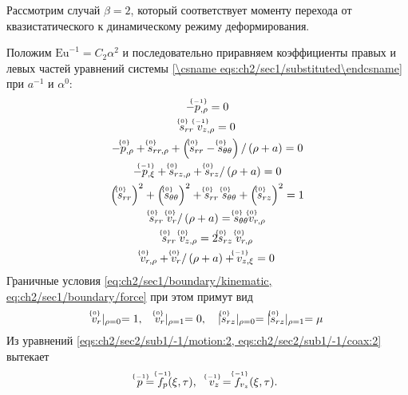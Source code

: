Рассмотрим случай $\beta=2$, который соответствует моменту перехода от квазистатического к динамическому режиму деформирования.

Положим $\text{Eu}^{-1} = C_2 \alpha^2$ и последовательно приравняем коэффициенты правых и левых частей уравнений системы \cref{\csname eqs:ch2/sec1/substituted\endcsname} при $a^{-1}$ и $\alpha^0$:
\begingroup
\allowdisplaybreaks
\begin{gather}
  \label{eqs:ch2/sec2/sub1/-1/motion:2}
  -\uindex{p}{-1}_{,\rho} = 0
  \\
  \label{eqs:ch2/sec2/sub1/-1/coax:2}
  \uindex{s}{0}_{rr} \; \uindex{v}{-1}_{z,\rho} = 0
  \\
  \label{eqs:ch2/sec2/sub1/0/motion:1}
  -\uindex{p}{0}_{,\rho}+\uindex{s}{0}_{rr,\rho} + \left(\uindex{s}{0}_{rr}-\uindex{s}{0}_{\theta\theta}\right) / \left(\rho + a\right) = 0
  \\
  \label{eqs:ch2/sec2/sub1/0/motion:2}
  -\uindex{p}{-1}_{,\xi} + \uindex{s}{0}_{rz,\rho} + \uindex{s}{0}_{rz} / \left(\rho+a\right) = 0
  \\
  \label{eqs:ch2/sec2/sub1/0/plasticity}
  \left(\uindex{s}{0}_{rr}\right)^2 + \left(\uindex{s}{0}_{\theta\theta}\right)^2 + \uindex{s}{0}_{rr}\; \uindex{s}{0}_{\theta\theta} + \left(\uindex{s}{0}_{rz}\right)^2 = 1
  \\
  \label{eqs:ch2/sec2/sub1/0/coax:1}
  \uindex{s}{0}_{rr} \; \uindex{v}{0}_{r} / \left(\rho+a\right) = \uindex{s}{0}_{\theta\theta} \uindex{v}{0}_{r,\rho}
  \\
  \label{eqs:ch2/sec2/sub1/0/coax:2}
  \uindex{s}{0}_{rr} \; \uindex{v}{0}_{z,\rho} = 2 \uindex{s}{0}_{rz} \; \uindex{v}{0}_{r,\rho}
  \\
  \label{eqs:ch2/sec2/sub1/0/uncompress}
  \uindex{v}{0}_{r,\rho} + \uindex{v}{0}_{r} / \left(\rho+a\right) + \uindex{v}{-1}_{z,\xi} = 0
\end{gather}
\endgroup
Граничные условия \cref{eq:ch2/sec1/boundary/kinematic, eq:ch2/sec1/boundary/force} при этом примут вид
\begin{equation}
  \label{eq:ch2/sec2/sub1/boundary/0}
  \uindex{v}{0}_{r}\lvert_{\rho=0} = 1,\quad \uindex{v}{0}_{r}\lvert_{\rho=1} = 0, \quad \lvert \uindex{s}{0}_{rz}\lvert_{\rho=0} = \lvert \uindex{s}{0}_{rz}\lvert_{\rho=1} = \mu
\end{equation}
Из уравнений \cref{eqs:ch2/sec2/sub1/-1/motion:2, eqs:ch2/sec2/sub1/-1/coax:2} вытекает
\begin{equation*}
  \uindex{p}{-1} = \uindex{f}{-1}_{p}(\xi, \tau), \quad \uindex{v}{-1}_{z} = \uindex{f}{-1}_{v_{z}}(\xi, \tau).
\end{equation*}
